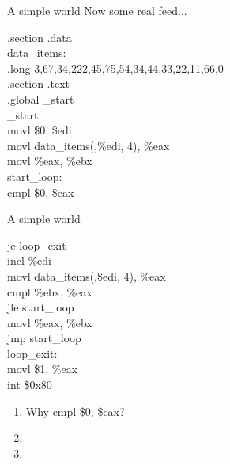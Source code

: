 \documentclass[UKenglish]{beamer}
\begin{document}
\begin{frame}{A simple world}
  Now some real feed...
  \begin{example}
    .section .data\\
    data\_items:\\
    .long 3,67,34,222,45,75,54,34,44,33,22,11,66,0\\
    .section .text\\
    .global \_start\\
    \_start:\\
    movl \$0, \$edi\\
    movl data\_items(,\%edi, 4), \%eax\\
    movl \%eax, \%ebx\\

    start\_loop:\\
    cmpl \$0, \$eax\\
  \end{example}
\end{frame}

\begin{frame}{A simple world}
  \begin{example}
    je loop\_exit\\
    incl \%edi\\
    movl data\_items(,\$edi, 4), \%eax\\
    cmpl \%ebx, \%eax\\
    jle start\_loop\\
    movl \%eax, \%ebx\\
    jmp start\_loop\\
    loop\_exit:\\
    movl \$1, \%eax\\
    int \$0x80\\
  \end{example}
  \begin{enumerate}
    \pause
  \item Why cmpl \$0, \$eax? \pause \color{red}{the last item of data\_items}
    \pause
  \item \color{black}{How to check result?} \pause \color{red}{echo \$?}
    \pause
  \item \color{black}{How to pass the result to next function?} \pause \color{red}{Euh...next section}
  \end{enumerate}
\end{frame}
\end{document}
